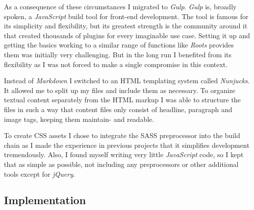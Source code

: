 As a consequence of these circumstances I migrated to \textit{Gulp}. \textit{Gulp} is, broadly spoken, a \textit{JavaScript} build tool for front-end development. The tool is famous for its simplicity and flexibility, but its greatest strength is the community around it that created thousands of plugins for every imaginable use case. Setting it up and getting the basics working to a similar range of functions like \textit{Roots} provides them was initially very challenging. But in the long run I benefited from its flexibility as I was not forced to make a single compromise in this context.

Instead of \textit{Markdown} I switched to an \ac{HTML} templating system called \textit{Nunjucks}. It allowed me to split up my files and include them as necessary. To organize textual content separately from the \ac{HTML} markup I was able to structure the files in such a way that content files only consist of headline, paragraph and image tags, keeping them maintain- and readable.

To create \ac{CSS} assets I chose to integrate the \ac{SASS} preprocessor into the build chain as I made the experience in previous projects that it simplifies development tremendously. Also, I found myself writing very little \textit{JavaScript} code, so I kept that as simple as possible, not including any preprocessors or other additional tools except for \textit{jQuery}.

\subsection{Implementation}


